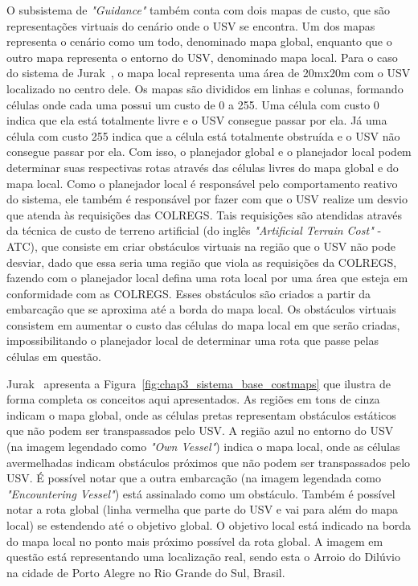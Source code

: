        O subsistema de \textit{"Guidance"} também conta com dois mapas de custo, que são representações virtuais do cenário onde o USV se encontra. Um dos mapas representa o cenário como um todo, denominado mapa global, enquanto que o outro mapa representa o entorno do USV, denominado mapa local. Para o caso do sistema de Jurak~\cite{Jurak2020COLREGS}, o mapa local representa uma área de 20mx20m com o USV localizado no centro dele. Os mapas são divididos em linhas e colunas, formando células onde cada uma possui um custo de 0 a 255. Uma célula com custo 0 indica que ela está totalmente livre e o USV consegue passar por ela. Já uma célula com custo 255 indica que a célula está totalmente obstruída e o USV não consegue passar por ela. Com isso, o planejador global e o planejador local podem determinar suas respectivas rotas através das células livres do mapa global e do mapa local. Como o planejador local é responsável pelo comportamento reativo do sistema, ele também é responsável por fazer com que o USV realize um desvio que atenda às requisições das COLREGS. Tais requisições são atendidas através da técnica de custo de terreno artificial (do inglês \textit{"Artificial Terrain Cost"} - ATC), que consiste em criar obstáculos virtuais na região que o USV não pode desviar, dado que essa seria uma região que viola as requisições da COLREGS, fazendo com o planejador local defina uma rota local por uma área que esteja em conformidade com as COLREGS. Esses obstáculos são criados a partir da embarcação que se aproxima até a borda do mapa local. Os obstáculos virtuais consistem em aumentar o custo das células do mapa local em que serão criadas, impossibilitando o planejador local de determinar uma rota que passe pelas células em questão. 
       
       Jurak~\cite{Jurak2020COLREGS} apresenta a Figura~\ref{fig:chap3_sistema_base_costmaps} que ilustra de forma completa os conceitos aqui apresentados. As regiões em tons de cinza indicam o mapa global, onde as células pretas representam obstáculos estáticos que não podem ser transpassados pelo USV. A região azul no entorno do USV (na imagem legendado como \textit{"Own Vessel"}) indica o mapa local, onde as células avermelhadas indicam obstáculos próximos que não podem ser transpassados pelo USV. É possível notar que a outra embarcação (na imagem legendada como \textit{"Encountering Vessel"}) está assinalado como um obstáculo. Também é possível notar a rota global (linha vermelha que parte do USV e vai para além do mapa local) se estendendo até o objetivo global. O objetivo local está indicado na borda do mapa local no ponto mais próximo possível da rota global. A imagem em questão está representando uma localização real, sendo esta o Arroio do Dilúvio na cidade de Porto Alegre no Rio Grande do Sul, Brasil.
       
